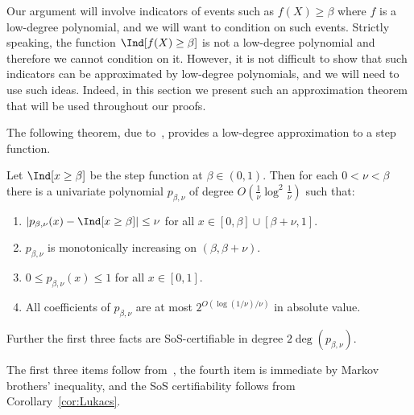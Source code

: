 
Our argument will involve indicators of events such as 
$f(X)\geq \beta$ where $f$ is a low-degree polynomial, and we will want to condition on such events. Strictly speaking, the function $\Ind[f(X)\geq \beta]$ is not a low-degree polynomial and therefore we cannot condition on it. However, it is not difficult to show that such indicators can be approximated by low-degree polynomials, and we will need to use such ideas. 
Indeed, in this section we present such an approximation theorem that will be used throughout our proofs.

The following theorem, due to~\cite{diakonikolas2010bounded}, provides a low-degree approximation to a step function.


\begin{theorem}\label{thm:step-approx}
Let $\Ind[x \geq \beta]$ be the step function at $\beta \in (0,1)$. Then for each $0 < \nu < \beta$ there is a univariate polynomial $p_{\beta,\nu}$ of degree $O(\frac{1}{\nu}\log^2\frac{1}{\nu})$ such that:
\begin{enumerate}
\item $|p_{\beta,\nu}(x) - \Ind[x \geq \beta]| \le \nu$ for all $x \in [0, \beta] \cup [\beta +\nu, 1]$.
\item $p_{\beta,\nu}$ is monotonically increasing on $(\beta, \beta + \nu)$.
\item $0 \le p_{\beta,\nu}(x) \le 1$ for all $x \in [0,1]$.
\item All coefficients of $p_{\beta,\nu}$ are at most
$2^{O(\log(1/\nu)/\nu)}$ in absolute value.
\end{enumerate}
Further the first three facts are SoS-certifiable in degree $2\deg(p_{\beta,\nu})$.
\end{theorem}
The first three items follow from~\cite[Theorem 4.5]{diakonikolas2010bounded}, the fourth 
item is immediate by Markov brothers' inequality, and the SoS certifiability follows from Corollary~\ref{cor:Lukacs}.

